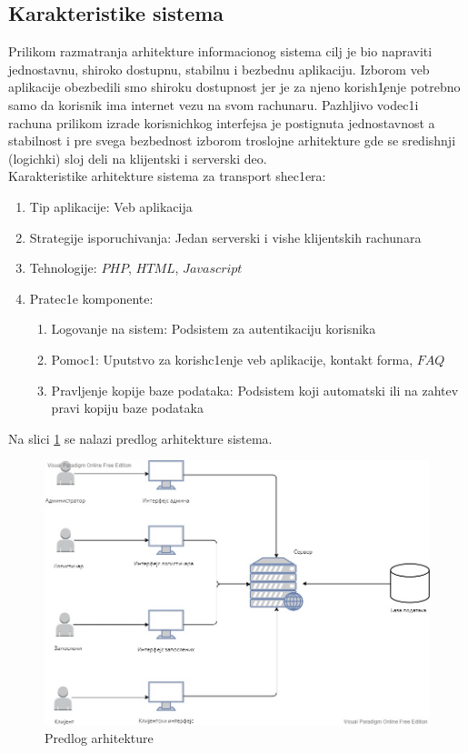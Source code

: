 \subsection{Karakteristike sistema}
Prilikom razmatranja arhitekture informacionog sistema cilj je bio napraviti jednostavnu, shiroko dostupnu, stabilnu i bezbednu aplikaciju. Izborom veb aplikacije obezbedili smo shiroku dostupnost jer je za njeno korish\c1enje potrebno samo da korisnik ima
internet vezu na svom rachunaru. Pazhljivo vodec1i rachuna prilikom izrade korisnichkog
interfejsa je postignuta jednostavnost a stabilnost i pre svega bezbednost izborom
troslojne arhitekture gde se sredishnji (logichki) sloj deli na klijentski i serverski deo.\\
Karakteristike arhitekture sistema za transport shec1era:
\begin{enumerate}
    \item  Tip aplikacije: Veb aplikacija
    \item Strategije isporuchivanja: Jedan serverski i vishe klijent\-skih rachunara
    \item Tehnologije: $PHP$, $HTML$, $Javascript$
    \item Pratec1e komponente:

    \begin{enumerate}
        \item  Logovanje na sistem: Podsistem za autentikaciju korisnika
        \item Pomoc1: Uput\-stvo za korish\-c1enje veb aplikacije, kontakt forma, $FAQ$
        \item Pravljenje kopije baze podataka: Podsistem koji automatski ili na zahtev pravi kopiju baze podataka
        \end{enumerate}

\end{enumerate}
Na slici \ref{fig:arh} se nalazi predlog arhitekture sistema.

\begin{figure}[H]
    \centering
    \includegraphics[width=12cm]{Slike/Arhitektura/arhitektura .jpg}
    \caption{Predlog arhitekture}
    \label{fig:arh}
\end{figure}



